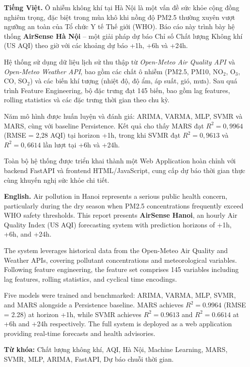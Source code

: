 \documentclass[12pt,a4paper]{report}
\begin{document}
\textbf{Tiếng Việt.}
Ô nhiễm không khí tại Hà Nội là một vấn đề sức khỏe cộng đồng nghiêm trọng, đặc biệt trong mùa khô khi nồng độ PM2.5 thường xuyên vượt ngưỡng an toàn của Tổ chức Y tế Thế giới (WHO). Báo cáo này trình bày hệ thống \textbf{AirSense Hà Nội} -- một giải pháp dự báo Chỉ số Chất lượng Không khí (US AQI) theo giờ với các khoảng dự báo +1h, +6h và +24h.

Hệ thống sử dụng dữ liệu lịch sử thu thập từ \textit{Open-Meteo Air Quality API} và \textit{Open-Meteo Weather API}, bao gồm các chất ô nhiễm (PM2.5, PM10, NO$_2$, O$_3$, CO, SO$_2$) và các biến khí tượng (nhiệt độ, độ ẩm, áp suất, gió, mưa). Sau quá trình Feature Engineering, bộ đặc trưng đạt 145 biến, bao gồm lag features, rolling statistics và các đặc trưng thời gian theo chu kỳ.

Năm mô hình được huấn luyện và đánh giá: ARIMA, VARMA, MLP, SVMR và MARS, cùng với baseline Persistence. Kết quả cho thấy MARS đạt $R^2 = 0{,}9964$ (RMSE = 2,28 AQI) tại horizon +1h, trong khi SVMR đạt $R^2 = 0{,}9613$ và $R^2 = 0{,}6614$ lần lượt tại +6h và +24h.

Toàn bộ hệ thống được triển khai thành một Web Application hoàn chỉnh với backend FastAPI và frontend HTML/JavaScript, cung cấp dự báo thời gian thực cùng khuyến nghị sức khỏe chi tiết.

\vspace{0.5cm}
\textbf{English.}
Air pollution in Hanoi represents a serious public health concern, particularly during the dry season when PM2.5 concentrations frequently exceed WHO safety thresholds. This report presents \textbf{AirSense Hanoi}, an hourly Air Quality Index (US AQI) forecasting system with prediction horizons of +1h, +6h, and +24h.

The system leverages historical data from the Open-Meteo Air Quality and Weather APIs, covering pollutant concentrations and meteorological variables. Following feature engineering, the feature set comprises 145 variables including lag features, rolling statistics, and cyclical time encodings.

Five models were trained and benchmarked: ARIMA, VARMA, MLP, SVMR, and MARS alongside a Persistence baseline. MARS achieves $R^2 = 0.9964$ (RMSE = 2.28) at horizon +1h, while SVMR achieves $R^2 = 0.9613$ and $R^2 = 0.6614$ at +6h and +24h respectively. The full system is deployed as a web application providing real-time forecasts and health advisories.

\vspace{0.5cm}
\textbf{Từ khóa:} Chất lượng không khí, AQI, Hà Nội, Machine Learning, MARS, SVMR, MLP, ARIMA, FastAPI, Dự báo chuỗi thời gian.
\end{document}
